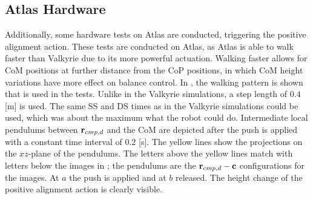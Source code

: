 \subsection{Atlas Hardware}
Additionally, some hardware tests on Atlas are conducted, triggering the positive alignment action. These tests are conducted on Atlas, as Atlas is able to walk faster than Valkyrie due to its more powerful actuation. Walking faster allows for \ac{CoM} positions at further distance from the \ac{CoP} positions, in which \ac{CoM} height variations have more effect on balance control. In , the walking pattern is shown that is used in the tests. Unlike in the Valkyrie simulations, a step length of $0.4$ [m] is used. The same \ac{SS} and \ac{DS} times as in the Valkyrie simulations could be used, which was about the maximum what the robot could do. Intermediate local pendulums between $\mathbf{r}_{cmp,d}$ and the \ac{CoM} are depicted after the push is applied with a constant time interval of $0.2$ [s]. The yellow lines show the projections on the $xz$-plane of the pendulums. The letters above the yellow lines match with letters below the images in ; the pendulums are the $\mathbf{r}_{cmp,d}-\mathbf{c}$ configurations for the images. At $a$ the push is applied and at $b$ released. The height change of the positive alignment action is clearly visible.
